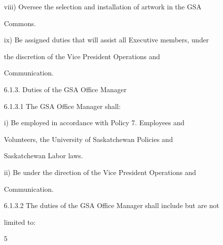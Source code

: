   



         viii)     Oversee  the  selection  and  installation  of  artwork  in  the  GSA  

                   Commons.   



  



         ix)       Be assigned duties that will assist all Executive members, under  

                   the     discretion        of     the     Vice       President        Operations          and  

                   Communication.   



  



                          6.1.3. Duties of the GSA Office Manager  



  



6.1.3.1   The  GSA Office Manager shall:   



  



         i)        Be  employed  in  accordance  with  Policy  7.  Employees  and  

                   Volunteers,   the          University        of    Saskatchewan           Policies       and  

                   Saskatchewan Labor laws.   



  



         ii)       Be  under  the  direction  of  the  Vice  President  Operations  and  

                   Communication.   



  



6.1.3.2   The  duties  of  the    GSA  Office  Manager  shall  include  but  are  not  

             limited to:   



  



                                                         5  

